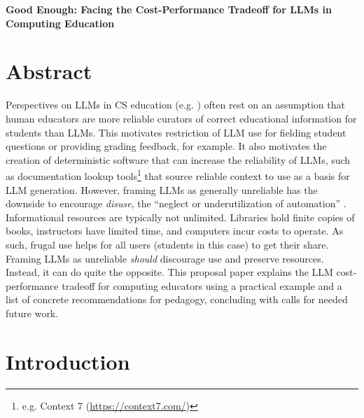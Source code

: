 \textbf{Good Enough: Facing the Cost-Performance Tradeoff for LLMs in Computing Education}

\section{Abstract}\label{abstract}

Perspectives on LLMs in CS education (e.g. \cite{falknerEffectiveUseLarge2026}) often rest on an assumption that human educators are more reliable curators of correct educational information for students than LLMs. This motivates restriction of LLM use for fielding student questions or providing grading feedback, for example. It also motivates the creation of deterministic software that can increase the reliability of LLMs, such as documentation lookup tools\footnote{e.g. Context 7 (\url{https://context7.com/})} that source reliable context to use as a basis for LLM generation. However, framing LLMs as generally unreliable has the downside to encourage \emph{disuse}, the ``neglect or underutilization of automation'' \cite{parasuramanHumansAutomationUse1997}. Informational resources are typically not unlimited. Libraries hold finite copies of books, instructors have limited time, and computers incur costs to operate. As such, frugal use helps for all users (students in this case) to get their share. Framing LLMs as unreliable \emph{should} discourage use and preserve resources. Instead, it can do quite the opposite. This proposal paper explains the LLM cost-performance tradeoff for computing educators using a practical example and a list of concrete recommendations for pedagogy, concluding with calls for needed future work.

\section{Introduction}\label{introduction}

